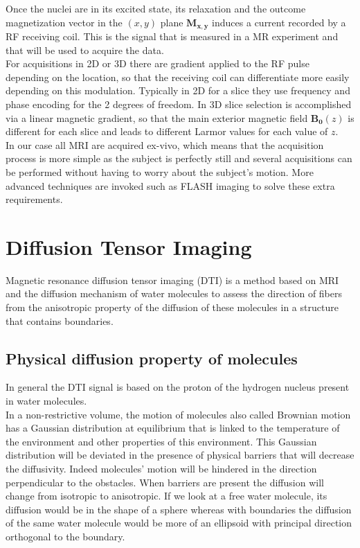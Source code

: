 Once the nuclei are in its excited state, its relaxation and the outcome magnetization vector in the $(x, y)$ plane $\mathbf{M_{x, y}}$ induces a current recorded by a RF receiving coil. This is the signal that is measured in a MR experiment and that will be used to acquire the data.\\
For acquisitions in 2D or 3D there are gradient applied to the RF pulse depending on the location, so that the receiving coil can differentiate more easily depending on this modulation. Typically in 2D for a slice they use frequency and phase encoding for the 2 degrees of freedom. In 3D slice selection is accomplished via a linear magnetic gradient, so that the main exterior magnetic field $\mathbf{B_0}(z)$ is different for each slice and leads to different Larmor values for each value of $z$.\\
In our case all MRI are acquired ex-vivo, which means that the acquisition process is more simple as the subject is perfectly still and several acquisitions can be performed without having to worry about the subject's motion. More advanced techniques are invoked such as FLASH imaging to solve these extra requirements.

\section{Diffusion Tensor Imaging}

Magnetic resonance diffusion tensor imaging (DTI) is a method based on MRI and the diffusion mechanism of water molecules to assess the direction of fibers from the anisotropic property of the diffusion of these molecules in a structure that contains boundaries.\\

\subsection{Physical diffusion property of molecules}

In general the DTI signal is based on the proton of the hydrogen nucleus present in water molecules.\\
In a non-restrictive volume, the motion of molecules also called Brownian motion has a Gaussian distribution at equilibrium that is linked to the temperature of the environment and other properties of this environment. This Gaussian distribution will be deviated in the presence of physical barriers that will decrease the diffusivity. Indeed molecules' motion will be hindered in the direction perpendicular to the obstacles. When barriers are present the diffusion will change from isotropic to anisotropic. If we look at a free water molecule, its diffusion would be in the shape of a sphere whereas with boundaries the diffusion of the same water molecule would be more of an ellipsoid with principal direction orthogonal to the boundary.

